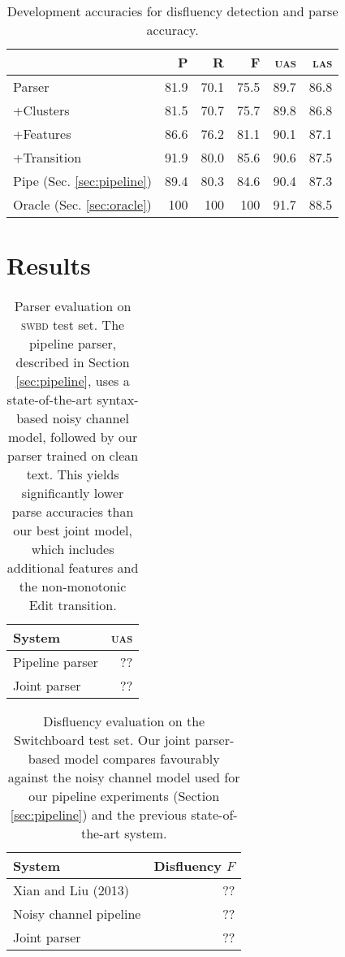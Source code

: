 \documentclass[11pt,letterpaper]{article}
\begin{document}
\begin{table}
    \centering
    \small
    \begin{tabular}{l|rrr|rr}
        & P & R & F & \textsc{uas} & \textsc{las} \\
        \hline \hline
        Parser      & 81.9 & 70.1 & 75.5 & 89.7  & 86.8 \\
        +Clusters   & 81.5 & 70.7 & 75.7 & 89.8  & 86.8 \\
        +Features   & 86.6 & 76.2 & 81.1 & 90.1  & 87.1 \\
        +Transition & 91.9 & 80.0 & 85.6 & 90.6  & 87.5 \\
        \hline
        Pipe (Sec. \ref{sec:pipeline})  & 89.4 & 80.3 & 84.6 & 90.4 & 87.3 \\
        \hline       
        Oracle (Sec. \ref{sec:oracle})  & 100 & 100 & 100 & 91.7 & 88.5 \\
        \hline
    \end{tabular}
\caption{Development accuracies for disfluency detection and parse accuracy.}
\end{table}



\section{Results}

\begin{table}
\centering
\begin{tabular}{l|r}
    System          & \textsc{uas} \\
    \hline \hline
    Pipeline parser & ?? \\
    Joint parser    & ?? \\
    \hline
\end{tabular}
\caption{Parser evaluation on \textsc{swbd} test set. The pipeline parser, described
    in Section \ref{sec:pipeline}, uses a state-of-the-art syntax-based noisy
    channel model, followed by our parser trained on clean text. This yields
    significantly lower parse accuracies than our best joint model, which includes
additional features and the non-monotonic Edit transition.\label{tab:parseval}}
\end{table}

\begin{table}
    \centering
    \begin{tabular}{l|r}
        System                      & Disfluency $F$ \\
        \hline \hline
        Xian and Liu (2013)         & ?? \\
        Noisy channel pipeline      & ?? \\
        Joint parser                & ?? \\
        \hline
    \end{tabular}
    \caption{Disfluency evaluation on the Switchboard test set. Our joint parser-based
             model compares favourably 
             against the noisy channel model used for our pipeline experiments
             (Section \ref{sec:pipeline}) and the previous state-of-the-art system.
         \label{tab:dfl_eval}}
\end{table}
\end{document}
